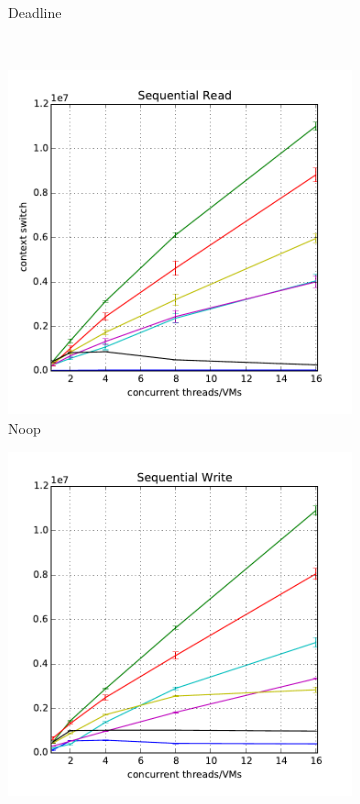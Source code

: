 \documentclass{acmsig}
\begin{document}
\begin{figure}[t]
\begin{subfigure}[b]{0.3\textwidth}
     \caption{Deadline}
     \label{fig:contextswitching_dealine_read}
   \end{subfigure}
    ~ %
   \begin{subfigure}[b]{0.3\textwidth}
     \includegraphics[width=\textwidth]{figures/contextswitching_noop_read.pdf}
     \caption{Noop}
     \label{fig:contextswitching_noop_read}
   \end{subfigure}
   \hfill
   \begin{subfigure}[b]{0.3\textwidth}
     \includegraphics[width=\textwidth]{figures/contextswitching_cfq_write.pdf}

\end{subfigure}
\end{figure}
\end{document}
